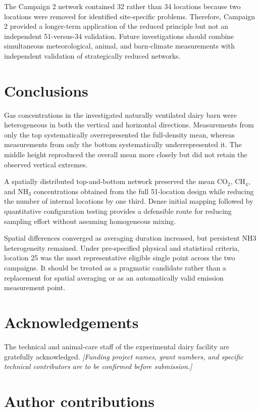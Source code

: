 \documentclass[12pt,a4paper]{article}
\begin{document}
The Campaign 2 network contained 32 rather than 34 locations because two
locations were removed for identified site-specific problems. Therefore,
Campaign 2 provided a longer-term application of the reduced principle but
not an independent 51-versus-34 validation. Future investigations should
combine simultaneous meteorological, animal, and barn-climate measurements
with independent validation of strategically reduced networks.

\section{Conclusions}

Gas concentrations in the investigated naturally ventilated dairy barn were
heterogeneous in both the vertical and horizontal directions. Measurements
from only the top systematically overrepresented the full-density mean,
whereas measurements from only the bottom systematically underrepresented it.
The middle height reproduced the overall mean more closely but did not retain
the observed vertical extremes.

A spatially distributed top-and-bottom network preserved the mean
\(\mathrm{CO_2}\), \(\mathrm{CH_4}\), and \(\mathrm{NH_3}\)
concentrations obtained from the full 51-location design while reducing the
number of internal locations by one third. Dense initial mapping followed by
quantitative configuration testing provides a defensible route for reducing
sampling effort without assuming homogeneous mixing.

Spatial differences converged as averaging duration increased, but persistent
NH3 heterogeneity remained. Under pre-specified physical and statistical
criteria, location 25 was the most representative eligible single point across
the two campaigns. It should be treated as a pragmatic candidate rather than a
replacement for spatial averaging or as an automatically valid emission
measurement point.

\section*{Acknowledgements}

The technical and animal-care staff of the experimental dairy facility are
gratefully acknowledged. \textit{[Funding project names, grant numbers, and
specific technical contributors are to be confirmed before submission.]}

\section*{Author contributions}
\end{document}
